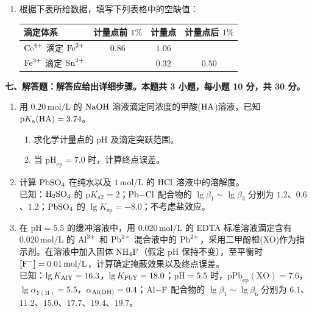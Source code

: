 \begin{enumerate}[label=\arabic*., itemsep=1.5ex]
    \item 根据下表所给数据，填写下列表格中的空缺值：
    \begin{center}
    \begin{tabular}{|l|c|c|c|}
    \hline
    滴定体系 & 计量点前 $1\%$ & 计量点 & 计量点后 $1\%$ \\
    \hline
    $\ce{Ce^{4+}}$ 滴定 $\ce{Fe^{2+}}$ & $0.86$ & $1.06$ & \\
    \hline
    $\ce{Fe^{3+}}$ 滴定 $\ce{Sn^{2+}}$ & & $0.32$ & $0.50$ \\
    \hline
    \end{tabular}
    \end{center}
\end{enumerate}

\vspace{0.5cm}
\noindent\textbf{七、解答题：解答应给出详细步骤。本题共 3 小题，每小题 10 分，共 30 分。}

\begin{enumerate}[label=\arabic*., itemsep=1.5ex]
    \item 用 $0.20\,\mathrm{mol/L}$ 的 $\ce{NaOH}$ 溶液滴定同浓度的甲酸($\ce{HA}$)溶液，已知 $\text{p}K_{\text{a}}(\ce{HA})=3.74$。
    \begin{enumerate}[label=(\arabic*), noitemsep, topsep=0pt, partopsep=0pt]
        \item 求化学计量点的 $\text{pH}$ 及滴定突跃范围。
        \item 当 $\text{pH}_{\text{ep}}=7.0$ 时，计算终点误差。
    \end{enumerate}

    \item 计算 $\ce{PbSO4}$ 在纯水以及 $1\,\mathrm{mol/L}$ 的 $\ce{HCl}$ 溶液中的溶解度。
    \\
    已知：$\ce{H2SO4}$ 的 $\text{p}K_{a2}=2$；$\ce{Pb-Cl}$ 配合物的 $\lg\beta_1\sim\lg\beta_3$ 分别为 $1.2$、$0.6$、$1.2$；$\ce{PbSO4}$ 的 $\lg K_{\text{sp}}=-8.0$；不考虑盐效应。

    \item 在 $\text{pH}=5.5$ 的缓冲溶液中，用 $0.020\,\mathrm{mol/L}$ 的 EDTA 标准溶液滴定含有 $0.020\,\mathrm{mol/L}$ 的 $\ce{Al^{3+}}$ 和 $\ce{Pb^{2+}}$ 混合液中的 $\ce{Pb^{2+}}$，采用二甲酚橙(XO)作为指示剂。在溶液中加入固体 $\ce{NH4F}$（假定 $\text{pH}$ 保持不变），至平衡时 $[\ce{F^-}]=0.01\,\mathrm{mol/L}$，计算确定掩蔽效果以及终点误差。
    \\
    已知：$\lg K_{\ce{AlY}}=16.3$，$\lg K_{\ce{PbY}}=18.0$；$\text{pH}=5.5$ 时，$\text{pPb}_{\text{ep}}(\text{XO})=7.6$，$\lg\alpha_{Y(\text{H})}=5.5$，$\alpha_{\ce{Al(OH)}}=0.4$；$\ce{Al-F}$ 配合物的 $\lg\beta_1\sim\lg\beta_6$ 分别为 $6.1$、$11.2$、$15.0$、$17.7$、$19.4$、$19.7$。
\end{enumerate}